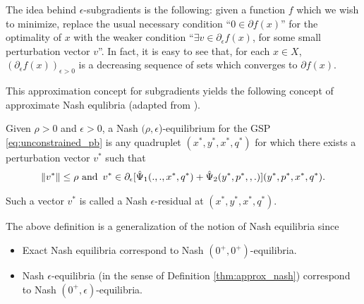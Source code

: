 \documentclass[envcountsame]{llcns2e/llncs}
\begin{document}
The idea behind $\epsilon$-subgradients is the following: given a
function $f$ which we wish to minimize, replace the usual necessary
condition ``$0 \in \partial f(x)$'' for the optimality of $x$ with the
weaker condition ``$\exists v \in \partial_\epsilon f(x)$, for some small
perturbation vector $v$''. In fact, it is easy to see that, for each
$x \in X$, $(\partial_\epsilon f(x))_{\epsilon > 0}$ is a decreasing
sequence of sets which converges to $\partial f(x)$.

This approximation concept for subgradients yields the following
concept of approximate Nash equlibria (adapted from
\cite{he2013accelerating}).

\begin{definition}
Given $\rho > 0$ and $\epsilon > 0$, a Nash
$(\rho,\epsilon$)-equilibrium for the GSP \eqref{eq:unconstrained_pb}
is any quadruplet $(x^*, y^*, x^*, q^*)$ for which
there exists a perturbation vector $v^*$ such that
\begin{eqnarray}
\|v^*\| \le \rho \text{ and}\hspace{.5em} v^* \in
\partial_\epsilon[\hat{\Psi}_1(., ., x^*, q^*) +
  \hat{\Psi}_2(y^*, p^*, , .)](y^*,p^*,x^*,q^*).
\end{eqnarray}

Such a vector $v^*$ is called a Nash $\epsilon$-residual at $(x^*,
y^*, x^*, q^*)$.
\label{thm:cool_notion}
\end{definition}


The above definition is a generalization of the notion of Nash
equilibria since
\begin{itemize}
\item Exact Nash equilibria correspond to Nash $(0^+,0^+)$-equilibria.
\item Nash $\epsilon$-equilibria (in the sense of Definition
  \ref{thm:approx_nash}) correspond to Nash $(0^+,\epsilon)$-equilibria.
\end{itemize}
\end{document}
